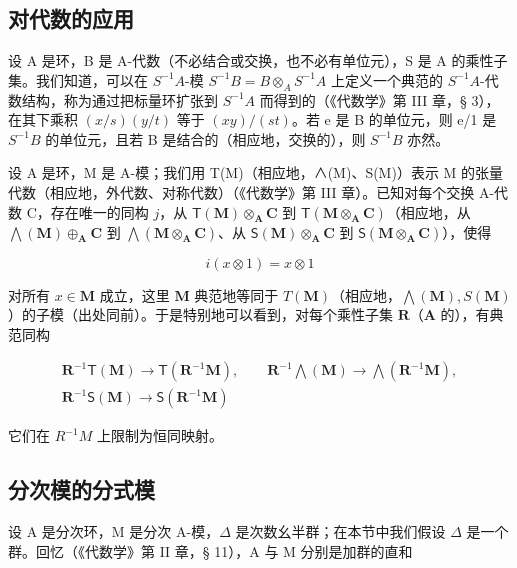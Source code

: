 \subsection{对代数的应用}

设 A 是环，B 是 A-代数（不必结合或交换，也不必有单位元），S 是 A 的乘性子集。我们知道，可以在 \(S^{-1}A\)-模 \(S^{-1}B = B \otimes_{A} S^{-1}A\) 上定义一个典范的 \(S^{-1}A\)-代数结构，称为通过把标量环扩张到 \(S^{-1}A\) 而得到的（《代数学》第 III 章，§ 3），在其下乘积 \((x/s)(y/t)\) 等于 \((xy)/(st)\)。若 e 是 B 的单位元，则 e/1 是 \(S^{-1}B\) 的单位元，且若 B 是结合的（相应地，交换的），则 \(S^{-1}B\) 亦然。

设 A 是环，M 是 A-模；我们用 T(M)（相应地，∧(M)、S(M)）表示 M 的张量代数（相应地，外代数、对称代数）（《代数学》第 III 章）。已知对每个交换 A-代数 C，存在唯一的同构 \(j\)，从 \(\mathsf{T}(\mathbf{M}) \otimes_{\mathbf{A}} \mathbf{C}\) 到 \(\mathsf{T}(\mathbf{M} \otimes_{\mathbf{A}} \mathbf{C})\)（相应地，从 \(\bigwedge (\mathbf{M}) \oplus_{\mathbf{A}} \mathbf{C}\) 到 \(\bigwedge (\mathbf{M} \otimes_{\mathbf{A}} \mathbf{C})\)、从 \(\mathsf{S}(\mathbf{M}) \otimes_{\mathbf{A}} \mathbf{C}\) 到 \(\mathsf{S}(\mathbf{M} \otimes_{\mathbf{A}} \mathbf{C})\)），使得

\[
i (x \otimes 1) = x \otimes 1
\]

对所有 \(x \in \mathbf{M}\) 成立，这里 \(\mathbf{M}\) 典范地等同于 \(T(\mathbf{M})\)（相应地，\(\bigwedge (\mathbf{M}), S(\mathbf{M})\)）的子模（出处同前）。于是特别地可以看到，对每个乘性子集 \(\mathbf{R}\)（\(\mathbf{A}\) 的），有典范同构

\[
\begin{array}{c} \mathbf {R} ^ {- 1} \mathsf {T} (\mathbf {M}) \to \mathsf {T} (\mathbf {R} ^ {- 1} \mathbf {M}), \qquad \mathbf {R} ^ {- 1} \bigwedge (\mathbf {M}) \to \bigwedge (\mathbf {R} ^ {- 1} \mathbf {M}), \\ \mathbf {R} ^ {- 1} \mathsf {S} (\mathbf {M}) \to \mathsf {S} (\mathbf {R} ^ {- 1} \mathbf {M}) \end{array}
\]

它们在 \(R^{-1}M\) 上限制为恒同映射。

\subsection{分次模的分式模}

设 A 是分次环，M 是分次 A-模，\(\Delta\) 是次数幺半群；在本节中我们假设 \(\Delta\) 是一个群。回忆（《代数学》第 II 章，§ 11），A 与 M 分别是加群的直和

